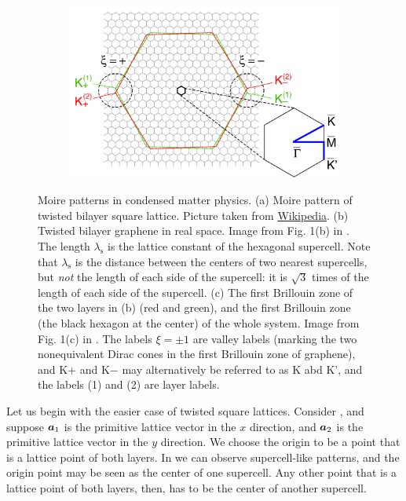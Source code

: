 \documentclass[hyperref, a4paper]{article}
\begin{document}
\begin{figure}
    \begin{subfigure}{0.3\textwidth}
        \centering
        \includegraphics[width=\textwidth]{structure/moire-k-graphene.PNG}
        \subcaption{}
        \label{fig:1bz-1}
    \end{subfigure}
    \caption{Moire patterns in condensed matter physics.
    (a) Moire pattern of twisted bilayer square lattice. 
    Picture taken from \href{https://en.wikipedia.org/wiki/Moir\%C3\%A9\_pattern\#/media/File:Moir\%C3\%A9\_grid.svg}{Wikipedia}.
    (b) Twisted bilayer graphene in real space. Image from Fig. 1(b) in \cite{padhi_doped_2018}.
    The length $\lambda_\text{s}$ is the lattice constant of the hexagonal supercell.
    Note that $\lambda_{\text{s}}$ is the distance between the centers of two nearest supercells,
    but \emph{not} the length of each side of the supercell:
    it is $\sqrt{3}$ times of the length of each side of the supercell.
    (c) The first Brillouin zone of the two layers in (b) (red and green),
    and the first Brillouin zone (the black hexagon at the center) of the whole system.
    Image from Fig. 1(c) in \cite{koshino_band_2019}.
    The labels $\xi = \pm 1$ are valley labels 
    (marking the two nonequivalent Dirac cones in the first Brillouin zone of graphene),
    and K$+$ and K$-$ may alternatively be referred to as K abd K',
    and the labels (1) and (2) are layer labels.
    }
\end{figure}

Let us begin with the easier case of twisted square lattices.
Consider , 
and suppose $\vb*{a}_1$ is the primitive lattice vector in the $x$ direction,
and $\vb*{a}_2$ is the primitive lattice vector in the $y$ direction.
We choose the origin to be a point 
that is a lattice point of both layers.
In  we can observe supercell-like patterns,
and the origin point may be seen as the center of one supercell.
Any other point that is a lattice point of both layers, then,
has to be the center of another supercell.
\end{document}
